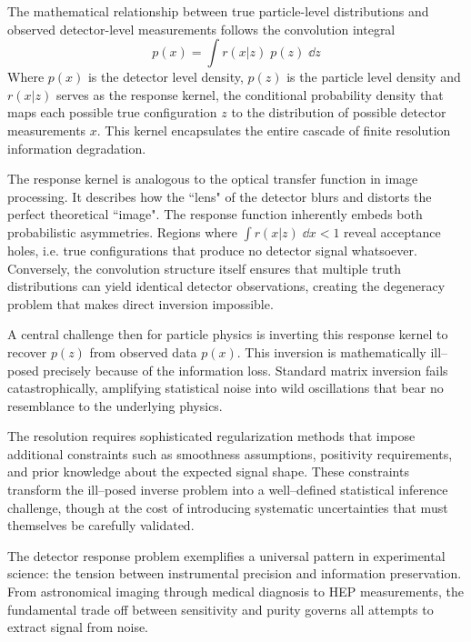     The mathematical relationship between true particle-level distributions and observed detector-level measurements follows the convolution integral
    \[
        p(x) = \int r(x|z)\;p(z)\; \dd z
    \]
    Where \(p(x)\) is the detector level density, \(p(z)\) is the particle level density and \(r(x|z)\) serves as the response kernel, the conditional probability density that maps each possible true configuration \(z\) to the distribution of possible detector measurements \(x\).
    This kernel encapsulates the entire cascade of finite resolution information degradation.
    
    The response kernel is analogous to the optical transfer function in image processing.
    It describes how the ``lens" of the detector blurs and distorts the perfect theoretical ``image".
    The response function inherently embeds both probabilistic asymmetries.
    Regions where \(\int r(x|z)\;\dd x < 1\) reveal acceptance holes, i.e. true configurations that produce no detector signal whatsoever.
    Conversely, the convolution structure itself ensures that multiple truth distributions can yield identical detector observations, creating the degeneracy problem that makes direct inversion impossible.
    
    A central challenge then for particle physics is inverting this response kernel to recover \(p(z)\) from observed data \(p(x)\).
    This inversion is mathematically ill--posed precisely because of the information loss.
    Standard matrix inversion fails catastrophically, amplifying statistical noise into wild oscillations that bear no resemblance to the underlying physics.
    
    The resolution requires sophisticated regularization methods that impose additional constraints such as smoothness assumptions, positivity requirements, and prior knowledge about the expected signal shape.
    These constraints transform the ill--posed inverse problem into a well--defined statistical inference challenge, though at the cost of introducing systematic uncertainties that must themselves be carefully validated.
    
    The detector response problem exemplifies a universal pattern in experimental science: the tension between instrumental precision and information preservation.
    From astronomical imaging through medical diagnosis to HEP measurements, the fundamental trade off between sensitivity and purity governs all attempts to extract signal from noise.

